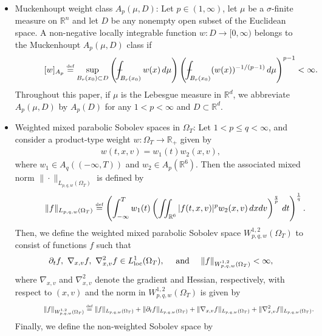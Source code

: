 \documentclass[reqno,11pt,final]{amsart}
\def\Xint#1{\mathchoice
{\XXint\displaystyle\textstyle{#1}}%
{\XXint\textstyle\scriptstyle{#1}}%
{\XXint\scriptstyle\scriptscriptstyle{#1}}%
{\XXint\scriptscriptstyle\scriptscriptstyle{#1}}%
\!\int}
\def\XXint#1#2#3{{\setbox0=\hbox{$#1{#2#3}{\int}$ }
\vcenter{\hbox{$#2#3$ }}\kern-.6\wd0}}
\theoremstyle{plain}
\numberwithin{equation}{section}
\numberwithin{theorem}{section}
\newcommand{\eqdef }{\overset{\mbox{\tiny{def}}}{=}}
\begin{document}
\begin{itemize}
\item Muckenhoupt weight class $A_p(\mu, D)$: Let $p\in (1,\infty)$, let $\mu$ be a $\sigma$-finite measure on $\mathbb{R}^n$ and let $D$ be any nonempty open subset of the Euclidean space. A non-negative locally integrable function $w : D \to[0,\infty)$ belongs to the Muckenhoupt $A_p(\mu, D)$ class if
\begin{align*}
\qquad\quad\ [w]_{A_p}  \eqdef \sup_{B_r(x_0)\subset D} \left(\Xint-_{B_r(x_0)} w(x)\,d\mu \right) \left( \Xint-_{B_r(x_0)}(w(x))^{-1/(p-1)}\,d\mu\right)^{p-1}<\infty.
\end{align*}Throughout this paper, if $\mu$ is the Lebesgue measure in $\mathbb{R}^d$, we abbreviate $A_p(\mu, D)$ by $A_p(D)$ for any $1<p<\infty$ and $D\subset \mathbb{R}^d$.
\item Weighted mixed parabolic Sobolev spaces in $\Omega_T$: Let $1<p\le q<\infty$, and consider a product-type weight $w : \Omega_T \to \mathbb{R}_+$ given by 
\begin{align*}
w(t,x,v) = w_1(t)w_2(x,v),
\end{align*}where $w_1\in A_q((-\infty,T))$ and $w_2\in A_p(\mathbb{R}^6)$. Then the associated mixed norm $\|\cdot\|_{L_{p,q,w}(\Omega_T)}$ is defined by
\begin{align*}
\qquad\quad\ \lVert f\rVert_{L_{p,q,w}(\Omega_T)} \eqdef \left( \int_{-\infty}^T w_1(t)\left( \iint_{\mathbb{R}^6} |f(t,x,v)|^p w_2(x,v)\,dxdv\right)^{\frac{q}{p}}\,dt\right)^{\frac{1}{q}}.
\end{align*}
Then, we define the weighted mixed parabolic Sobolev space $W_{p,q,w}^{1,2}(\Omega_T)$ to consist of functions $f$ such that
\begin{align*}
\partial_tf,\,\, \nabla_{x,v}f, \,\, \nabla_{x,v}^2f \in L^1_\textup{loc}(\Omega_T), \quad \textup{ and }\quad \| f\|_{W_{p,q,w}^{1,2}(\Omega_T)}<\infty,
\end{align*}where $\nabla_{x,v}$ and $\nabla_{x,v}^2$ denote the gradient and Hessian, respectively, with respect to $(x,v)$ and the norm in $W_{p,q,w}^{1,2}(\Omega_T)$ is given by
\begin{align}\label{def.para.sob}
\qquad\qquad\lVert f\rVert_{W_{p,q,w}^{1,2}(\Omega_T)} &\eqdef \lVert f\rVert_{L_{p,q,w}(\Omega_T)} + \lVert \partial_tf\rVert_{L_{p,q,w}(\Omega_T)} + \lVert \nabla_{x,v}f\rVert_{L_{p,q,w}(\Omega_T)} + \lVert \nabla_{x,v}^2f\rVert_{L_{p,q,w}(\Omega_T)}.
\end{align}Finally, we define the non-weighted Sobolev space by
\begin{align*}

\end{align*}
\end{itemize}
\end{document}

